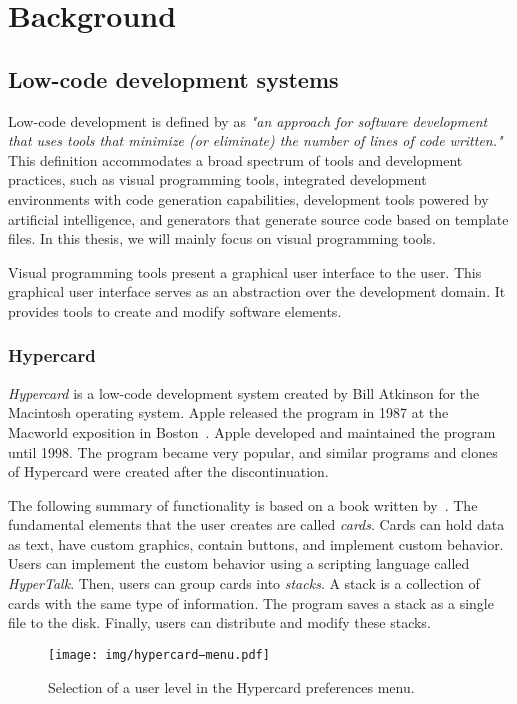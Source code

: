 \chapter{Background}
\label{chap:background}

\section{Low-code development systems}


Low-code development is defined by \citet{Pinho_Aguiar_Amaral_2023} as \emph{"an approach for software development that uses tools that minimize (or eliminate) the number of lines of code written."}
This definition accommodates a broad spectrum of tools and development practices, such as visual programming tools,
integrated development environments with code generation capabilities, development tools powered by artificial intelligence, and generators that generate source code based on template files.
In this thesis, we will mainly focus on visual programming tools.

Visual programming tools present a graphical user interface to the user. This graphical user interface serves as an abstraction over
the development domain. It provides tools to create and modify software elements.

\subsection{Hypercard}
\emph{Hypercard} is a low-code development system created by Bill Atkinson for the Macintosh operating system. Apple released the program in 1987 at the
Macworld exposition in Boston~\cite{hyper_release}. Apple developed and maintained the program until 1998. The program became very popular, and similar programs and clones of Hypercard were created after the discontinuation.


The following summary of functionality is based on a book written by~\citet{goodman_hypertext}.
The fundamental elements that the user creates are called \emph{cards}. Cards can hold data as text, have custom graphics, contain buttons, and implement custom behavior.
Users can implement the custom behavior using a scripting language called \emph{HyperTalk}. Then, users can group cards into \emph{stacks}. A stack is a collection of cards with the same type of information.
The program saves a stack as a single file to the disk. Finally, users can distribute and modify these stacks.

\begin{figure}
	\centering
	\texttt{[image: img/hypercard−menu.pdf]}
	\caption{Selection of a user level in the Hypercard preferences menu.}
	\label{fig:f}
\end{figure}


